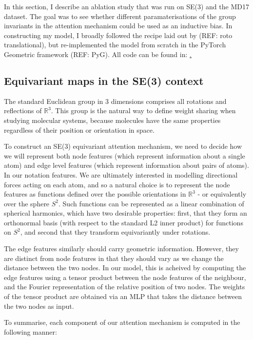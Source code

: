 \documentclass[11pt]{article}
\begin{document}
In this section, I describe an ablation study that was run on SE(3) and the MD17 dataset. The goal was to see whether different paramaterisations of the group invariants in the attention mechanism could be used as an inductive bias. In constructing my model, I broadly followed the recipe laid out by (REF: roto translational), but re-implemented the model from scratch in the PyTorch Geometric framework (REF: PyG). All code can be found in: \href{https://github.com/nsmat/transformer_invariants}.

\subsection*{Equivariant maps in the SE(3) context}

The standard Euclidean group in 3 dimensions comprises all rotations and reflections of $\mathbb{R}^3$. This group is the natural way to define weight sharing when studying molecular systems, because molecules have the same properties regardless of their position or orientation in space.

To construct an SE(3) equivariant attention mechanism, we need to decide how we will represent both node features (which represent information about a single atom) and edge level features (which represent information about pairs of atoms). In our notation features. We are ultimately interested in modelling directional forces acting on each atom, and so a natural choice is to represent the node features as functions defined over the possible orientations in $\mathbb{R}^3$  - or equivalently over the sphere $S^2$. Such functions can be represented as a linear combination of spherical harmonics, which have two desirable properties: first, that they form an orthonormal basis (with respect to the standard L2 inner product) for functions on $S^2$, and second that they transform equivariantly under rotations.

The edge features similarly should carry geometric information. However, they are distinct from node features in that they should vary as we change the distance between the two nodes. In our model, this is acheived by computing the edge features using a tensor product between the node features of the neighbour, and the Fourier representation of the relative position of two nodes. The weights of the tensor product are obtained via an MLP that takes the distance between the two nodes as input.

To summarise, each component of our attention mechanism is computed in the following manner:
\end{document}
